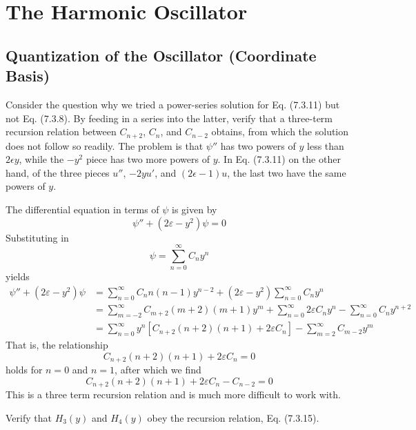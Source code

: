 \documentclass[../principles-of-quantum-mechanics.tex]{subfiles}
\begin{document}
	\printanswers
	
	\setcounter{section}{6}
	\section{The Harmonic Oscillator}
	
	\begin{questions}
		\setcounter{subsection}{2}
		\setcounter{question}{0}
		\subsection{Quantization of the Oscillator (Coordinate Basis)}
		\question Consider the question why we tried a power-series solution for Eq. (7.3.11) but not Eq. (7.3.8). By feeding in a series into the latter, verify that a three-term recursion relation between $C_{n+2}$, $C_n$, and $C_{n-2}$ obtains, from which the solution does not follow so readily. The problem is that $\psi''$ has two powers of $y$ less than $2\epsilon y$, while the $-y^2$ piece has two more powers of $y$. In Eq. (7.3.11) on the other hand, of the three pieces $u''$, $-2yu'$, and $(2\epsilon - 1)u$, the last two have the same powers of $y$.
		
		\begin{solution}
			The differential equation in terms of $\psi$ is given by
			$$\psi'' + (2\varepsilon - y^2)\psi = 0$$
			Substituting in
			$$\psi = \sum_{n=0}^{\infty}C_ny^n$$
			yields
			\begin{align*}
				\psi'' + (2\varepsilon - y^2)\psi &= \sum_{n=0}^{\infty}C_nn(n-1)y^{n-2} + (2\varepsilon - y^2)\sum_{n=0}^{\infty}C_ny^n \\
				&= \sum_{m=-2}^{\infty}C_{m+2}(m+2)(m+1)y^m + \sum_{n=0}^{\infty}2\varepsilon C_ny^n- \sum_{n=0}^{\infty}C_ny^{n+2} \\
				&= \sum_{n=0}^{\infty}y^n[C_{n+2}(n+2)(n+1) + 2\varepsilon C_n] - \sum_{m=2}^{\infty}C_{m-2}y^m
			\end{align*}
			That is, the relationship
			$$C_{n+2}(n+2)(n+1) + 2\varepsilon C_n = 0$$
			holds for $n = 0$ and $n = 1$, after which we find
			$$C_{n+2}(n+2)(n+1) + 2\varepsilon C_n - C_{n - 2} = 0$$
			This is a three term recursion relation and is much more difficult to work with.
		\end{solution}
		
		\question Verify that $H_3(y)$ and $H_4(y)$ obey the recursion relation, Eq. (7.3.15).
		

\end{questions}
\end{document}
